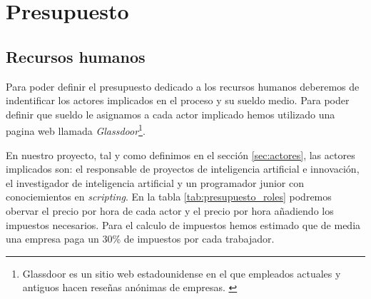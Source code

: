 \chapter{Presupuesto}
\label{cap:presupuesto}

\section{Recursos humanos}
\label{sec:recursos_humanos}

Para poder definir el presupuesto dedicado a los recursos humanos deberemos de indentificar los actores implicados en el proceso y su sueldo medio. Para poder definir que sueldo
le asignamos a cada actor implicado hemos utilizado una pagina web llamada \textit{Glassdoor}\footnote{Glassdoor es un sitio web estadounidense en el que empleados actuales y 
antiguos hacen reseñas anónimas de empresas. \cite{Glassdoor}}.

En nuestro proyecto, tal y como definimos en el sección \ref{sec:actores}, las actores implicados son: el responsable de proyectos de inteligencia artificial e innovación,
el investigador de inteligencia artificial y un programador junior con conociemientos en \textit{scripting}. En la tabla \ref{tab:presupuesto_roles} podremos obervar el precio 
por hora de cada actor y el precio por hora añadiendo los impuestos necesarios. Para el calculo de impuestos hemos estimado que de media una empresa paga un 30\% de impuestos por 
cada trabajador.

